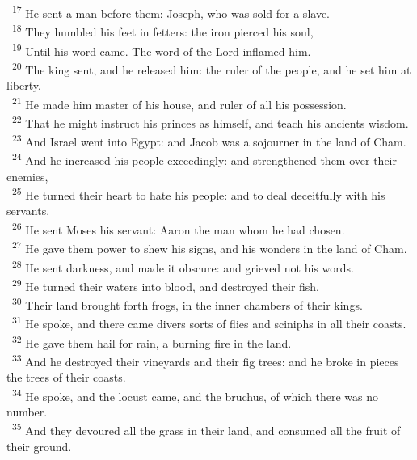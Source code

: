 \documentclass[a5paper,12pt]{article}
\begin{document}
\begin{multicols*}{2}
~\textsuperscript{17} He sent a man before them: Joseph, who was sold for a slave.\\
~\textsuperscript{18} They humbled his feet in fetters: the iron pierced his soul,\\
~\textsuperscript{19} Until his word came. The word of the Lord inflamed him.\\
~\textsuperscript{20} The king sent, and he released him: the ruler of the people, and he set him at liberty.\\
~\textsuperscript{21} He made him master of his house, and ruler of all his possession.\\
~\textsuperscript{22} That he might instruct his princes as himself, and teach his ancients wisdom.\\
~\textsuperscript{23} And Israel went into Egypt: and Jacob was a sojourner in the land of Cham.\\
~\textsuperscript{24} And he increased his people exceedingly: and strengthened them over their enemies,\\
~\textsuperscript{25} He turned their heart to hate his people: and to deal deceitfully with his servants.\\
~\textsuperscript{26} He sent Moses his servant: Aaron the man whom he had chosen.\\
~\textsuperscript{27} He gave them power to shew his signs, and his wonders in the land of Cham.\\
~\textsuperscript{28} He sent darkness, and made it obscure: and grieved not his words.\\
~\textsuperscript{29} He turned their waters into blood, and destroyed their fish.\\
~\textsuperscript{30} Their land brought forth frogs, in the inner chambers of their kings.\\
~\textsuperscript{31} He spoke, and there came divers sorts of flies and sciniphs in all their coasts.\\
~\textsuperscript{32} He gave them hail for rain, a burning fire in the land.\\
~\textsuperscript{33} And he destroyed their vineyards and their fig trees: and he broke in pieces the trees of their coasts.\\
~\textsuperscript{34} He spoke, and the locust came, and the bruchus, of which there was no number.\\
~\textsuperscript{35} And they devoured all the grass in their land, and consumed all the fruit of their ground.\\

\end{multicols*}
\end{document}
